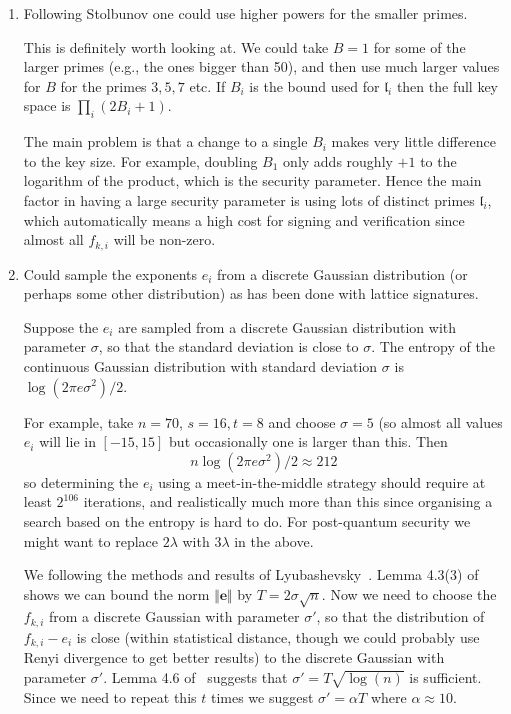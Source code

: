 \documentclass{llncs}
\renewcommand{\l}{\mathfrak{l}}
\newcommand{\e}{\textbf{e}}
\begin{document}
\begin{enumerate}
\item Following Stolbunov one could use higher powers for the smaller primes.

This is definitely worth looking at. We could take $B=1$ for some of the larger primes (e.g., the ones bigger than 50), and then use much larger values for $B$ for the primes $3, 5, 7$ etc. If $B_i$ is the bound used for $\l_i$ then the full key space is $\prod_i (2B_i + 1)$.

The main problem is that a change to a single $B_i$ makes very little difference to the key size. For example, doubling $B_1$ only adds roughly $+1$ to the logarithm of the product, which is the security parameter.
Hence the main factor in having a large security parameter is using lots of distinct primes $\l_i$, which automatically means a high cost for signing and verification since almost all $f_{k,i}$ will be non-zero.



\item Could sample the exponents $e_i$ from a discrete Gaussian distribution (or perhaps some other distribution) as has been done with lattice signatures.

Suppose the $e_i$ are sampled from a discrete Gaussian distribution with parameter $\sigma$, so that the standard deviation is close to $\sigma$. The entropy of the continuous Gaussian distribution with standard deviation $\sigma$ is $\log( 2 \pi e \sigma^2 )/2$.

For example, take $n=70$, $s = 16, t = 8$ and choose $\sigma = 5$ (so almost all values $e_{i}$ will lie in $[-15,15]$ but occasionally one is larger than this. Then
\[
   n \log( 2 \pi e \sigma^2 )/2 \approx 212
\]
so determining the $e_i$ using a meet-in-the-middle strategy should require at least $2^{106}$ iterations, and realistically much more than this since organising a search based on the entropy is hard to do. For post-quantum security we might want to replace $2 \lambda$ with $3\lambda$ in the above.

We following the methods and results of Lyubashevsky~\cite{Lyu12}. Lemma 4.3(3) of~\cite{Lyu12} shows we can bound the norm $\Vert \e \Vert$ by $T = 2 \sigma \sqrt{n}$.
Now we need to choose the $f_{k,i}$ from a discrete Gaussian with parameter $\sigma'$, so that the distribution of $f_{k,i} - e_i$ is close (within statistical distance, though we could probably use Renyi divergence to get better results) to the discrete Gaussian with parameter $\sigma'$.
Lemma 4.6 of~\cite{Lyu12} suggests that $\sigma' = T \sqrt{\log(n)}$ is sufficient. Since we need to repeat this $t$ times we suggest $\sigma' = \alpha T $ where $\alpha \approx 10$.


\end{enumerate}
\end{document}
